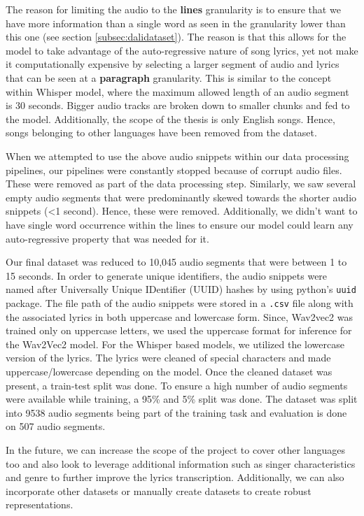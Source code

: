The reason for limiting the audio to the \textbf{lines} granularity is to ensure that we have more information than a single word as seen in the granularity lower than this one (see section \ref{subsec:dalidataset}). The reason is that this allows for the model to take advantage of the auto-regressive nature of song lyrics, yet not make it computationally expensive by selecting a larger segment of audio and lyrics that can be seen at a \textbf{paragraph} granularity. This is similar to the concept within Whisper model, where the maximum allowed length of an audio segment is 30 seconds. Bigger audio tracks are broken down to smaller chunks and fed to the model. Additionally, the scope of the thesis is only English songs. Hence, songs belonging to other languages have been removed from the dataset. 

When we attempted to use the above audio snippets within our data processing pipelines, our pipelines were constantly stopped because of corrupt audio files. These were removed as part of the data processing step. Similarly, we saw several empty audio segments that were predominantly skewed towards the shorter audio snippets (<1 second). Hence, these were removed. Additionally, we didn't want to have single word occurrence within the lines to ensure our model could learn any auto-regressive property that was needed for it. 

Our final dataset was reduced to 10,045 audio segments that were between 1 to 15 seconds. In order to generate unique identifiers, the audio snippets were named after Universally Unique IDentifier (UUID) hashes by using python's \texttt{uuid} package. The file path of the audio snippets were stored in a \texttt{.csv} file along with the associated lyrics in both uppercase and lowercase form. Since, Wav2vec2 was trained only on uppercase letters, we used the uppercase format for inference for the Wav2Vec2 model. For the Whisper based models, we utilized the lowercase version of the lyrics. The lyrics were cleaned of special characters and made uppercase/lowercase depending on the model. Once the cleaned dataset was present, a train-test split was done. To ensure a high number of audio segments were available while training, a 95\% and 5\% split was done.  The dataset was split into 9538 audio segments being part of the training task and evaluation is done on 507 audio segments. 

In the future, we can increase the scope of the project to cover other languages too and also look to leverage additional information such as singer characteristics and genre to further improve the lyrics transcription. Additionally, we can also incorporate other datasets or manually create datasets to create robust representations.



